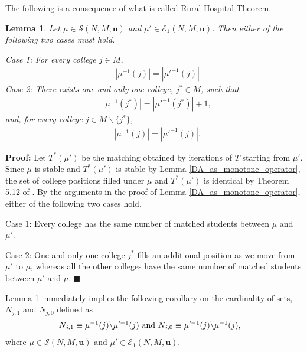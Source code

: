\documentclass[12pt, fullpage]{amsart}
\newtheorem{lemma}{Lemma}[section]
\theoremstyle{definition}
\theoremstyle{definition}
\theoremstyle{definition}
\begin{document}
\begin{bibunit}[econometrica]
The following is a consequence of what is called Rural Hospital Theorem. 

\begin{lemma}
	\label{lem:taxonomy_1_vacancy_or_no_filled}
	Let $\mu\in\mathcal{S}(N,M,\boldsymbol{u})$	and $\mu'\in\mathcal{E}_1(N,M,\boldsymbol{u})$. Then either of the following two cases must hold.
	
	\noindent Case 1:  For every college $j\in M$, 
	\begin{align}\label{eq:same_number_of_college_positions_filled_every_college}
		&|\mu^{-1}(j)|=|\mu'^{-1}(j)|
	\end{align}
	\noindent Case 2: There exists one and only one college, $j^{*}\in M$, such that
	\begin{align}\label{eq:one_and_only_one_college_fills_extra}
		&|\mu^{-1}(j^{*})|=|\mu'^{-1}(j^{*})|+1,
	\end{align}
	and, for every college $j\in M\backslash \{ j^{*}\}$,
	\begin{align}\label{eq:everybody_else_the_same}
		&|\mu^{-1}(j)|=|\mu'^{-1}(j)|.
	\end{align}	
\end{lemma}
\noindent \textbf{Proof:}  Let $T^{*}(\mu')$ be the matching obtained by iterations of $T$ starting from $\mu'$. Since $\mu$ is stable and $T^{*}(\mu')$ is stable by Lemma \ref{DA_as_monotone_operator}, the set of college positions filled under $\mu$ and $T^{*}(\mu')$ is identical by Theorem 5.12 of \cite{Roth/Sotomayor:90:TwoSidedMatching}. By the arguments in the proof of Lemma \ref{DA_as_monotone_operator}, either of the following two cases hold.

Case 1: Every college has the same number of matched students between $\mu$ and $\mu'$.

Case 2: One and only one college $j^{*}$ fills an additional position as we move from $\mu'$ to $\mu$, whereas all the other colleges have the same number of matched students between $\mu'$ and $\mu$. $\blacksquare$\medskip 

Lemma \ref{lem:taxonomy_1_vacancy_or_no_filled} immediately implies the following corollary on the cardinality of sets, $N_{j,1}$ and $N_{j,0}$ defined as
\begin{align}
	\label{N_{j1} N_{j0}}
	&		N_{j,1} \equiv\mu^{-1}(j)\backslash\mu'^{-1}(j)\text{ and }
	N_{j,0} \equiv\mu'^{-1}(j)\backslash\mu^{-1}(j),
\end{align}
where $\mu\in\mathcal{S}(N,M,\boldsymbol{u})$	and $\mu'\in\mathcal{E}_1(N,M,\boldsymbol{u})$.


\end{bibunit}
\end{document}
